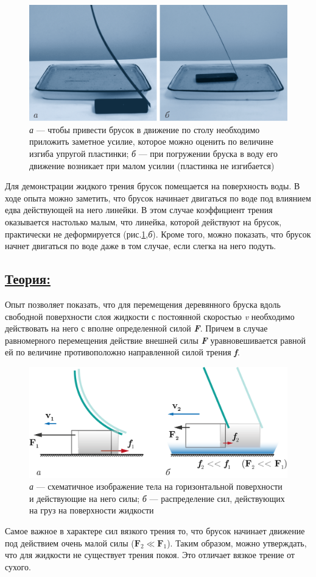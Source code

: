 \documentclass[14pt,a4paper,oneside]{extarticle}	%
\begin{document}
		\begin{figure}[H] 
		\centering 	
		\includegraphics[width=0.75\linewidth]{friction-2.png}
		\caption{\textit{а} — чтобы привести брусок в движение по столу необходимо приложить заметное усилие, которое можно оценить по величине изгиба упругой пластинки; \textit{б} — при погружении бруска в воду его движение возникает при малом усилии (пластинка не изгибается) }
		\label{friction-2}
	\end{figure}

	Для демонстрации жидкого трения брусок помещается на поверхность воды.
	В ходе опыта можно заметить, что брусок начинает двигаться по воде под влиянием едва действующей на него линейки.
	В этом случае коэффициент трения оказывается настолько малым, что линейка, 
	которой действуют на брусок, практически не деформируется (рис.\ref{friction-2},\textit{б}).
	Кроме того, можно показать, что брусок начнет двигаться по воде даже в том случае, 
	если слегка на него подуть.
	


	\newpage	
\subsection*{\underline{Теория:}}

Опыт позволяет показать, что для перемещения деревянного бруска вдоль свободной поверхности слоя жидкости с постоянной скоростью \textit{v} необходимо действовать на него с вполне определенной силой \textit{\textbf{F}}.
Причем в случае равномерного перемещения действие внешней силы \textit{\textbf{F}} уравновешивается равной ей по величине противоположно направленной силой трения \textit{\textbf{f}}.

	\begin{figure}[H] 
	\centering 	
	\includegraphics[width=0.9\linewidth]{friction-3.png}
	\caption{\textit{а} — схематичное изображение тела на горизонтальной поверхности и действующие на него силы; \textit{б} — распределение сил, действующих на груз на поверхности жидкости}
	\label{friction-3}
\end{figure}

Самое важное в характере сил вязкого трения то, что брусок начинает движение под действием очень малой силы ($ \textbf{F}_2 \ll \textbf{F}_1 $).
Таким образом, можно утверждать, что для жидкости не существует трения покоя. 
Это отличает вязкое трение от сухого.
	
\end{document}
